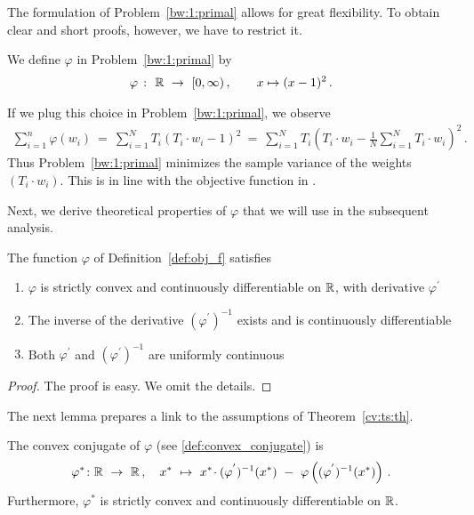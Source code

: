 The formulation of Problem~\ref{bw:1:primal} allows for great 
flexibility.
%
To obtain clear and short proofs, however, we have to restrict it.
%
\begin{definition}
  \label{def:obj_f}
  We define $\varphi$ in Problem~\ref{bw:1:primal} by
  \begin{align*}
    \varphi
    \ 
    \colon
    \ 
    \R
    \ 
    \to
    \ 
    [0,\infty)
    \,,
    \qquad
    x\mapsto (x-1)^2
    \,.
  \end{align*}
\end{definition}
\begin{remark}
  If we plug this choice in Problem~\ref{bw:1:primal},
  we observe
  \begin{align*}
    \sum_{i=1}^{n} 
\varphi(w_i)
\ 
=
\ 
    \sum_{i=1}^{N}
    T_i
    \left( 
      T_i\cdot w_i
      -
      1
    \right)
    ^{2}
\ 
=
\ 
    \sum_{i=1}^{N}
    T_i
    \left( 
      T_i\cdot w_i
      -
      \frac{1}{N}
      \sum_{i=1}^{N} 
      T_i\cdot w_i
    \right)
    ^{2}
    \,.
  \end{align*}
  Thus Problem~\ref{bw:1:primal} minimizes the sample variance of the weights 
  $(T_i\cdot w_i)$. This is in line with the objective function in \cite{Zubizarreta2015}.
\end{remark}
Next, we derive theoretical properties of $\varphi$ that we will use in the subsequent analysis.
\begin{lemma}
  \label{lem:obj_f}
  The function $\varphi$ of Definition~\ref{def:obj_f} satisfies

  \begin{enumerate}[label=(\roman*)]
    \item $\varphi$ is strictly convex and continuously differentiable on $\mathbb{R}$, with derivative $\varphi^{'}$
    \item
      The inverse of the derivative 
      $(\varphi^{'})^{-1}$
      exists and is continuously differentiable
    \item
      Both $\varphi^{'}$ and
      $(\varphi^{'})^{-1}$
      are uniformly continuous
  \end{enumerate}
\end{lemma}
\begin{proof}
  The proof is easy. We omit the details.
\end{proof}
The next lemma prepares a link to the assumptions of Theorem~\ref{cv:ts:th}.
\begin{lemma}
  \label{1165}
  The convex conjugate of $\varphi$ (see \eqref{def:convex_conjugate}) is
  \begin{gather*}
    \varphi^*
    \colon
    \R
    \ 
    \to
    \ 
    \R
    \,,
    \quad
    x^*
    \ 
    \mapsto
    \ 
    x^*
    \!
    \cdot
    (
    \varphi^{'}
    )^{-1}
    (x^*)
    \ 
    -
    \ 
    \varphi
    \left( 
      (
    \varphi^{'}
    )^{-1}
    (x^*)
    \right)
    \,.
  \end{gather*}
  Furthermore, $\varphi^*$ is strictly convex and continuously differentiable on $\mathbb{R}$.
\end{lemma}
